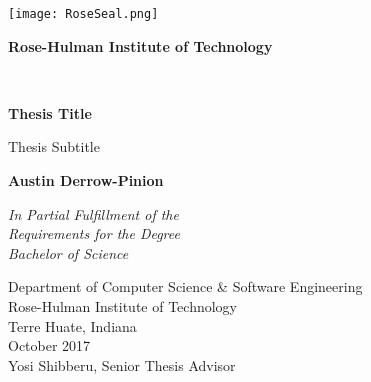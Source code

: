 \begin{titlepage}
    \begin{center}
        \vspace*{0.4cm}

        \noindent\begin{minipage}{0.3\textwidth}
        \texttt{[image: RoseSeal.png]}
        \end{minipage}
        \hfill
        \begin{minipage}{0.6\textwidth}
        \raggedright\LARGE\bfseries
        Rose-Hulman Institute of Technology
        \end{minipage}

        \vspace*{1cm}

        \noindent\makebox[\linewidth]{\rule{\textwidth}{1pt}}\\
        \vspace{0.4cm}
        {\Huge \bfseries
        Thesis Title  %
        \par}
        \vspace{0.4cm}
        \noindent\makebox[\linewidth]{\rule{\textwidth}{1pt}}

        \vspace{0.5cm}
        \LARGE
        Thesis Subtitle

        \vspace{1.5cm}

        \textbf{Austin Derrow-Pinion}

        \vfill

        \large
        \textit{
            In Partial Fulfillment of the\\
            Requirements for the Degree\\
            Bachelor of Science
        }

        \vspace{1cm}

        \Large
        Department of Computer Science \& Software Engineering\\
        Rose-Hulman Institute of Technology\\
        Terre Huate, Indiana\\
        October 2017\\
        Yosi Shibberu, Senior Thesis Advisor

    \end{center}
\end{titlepage}
